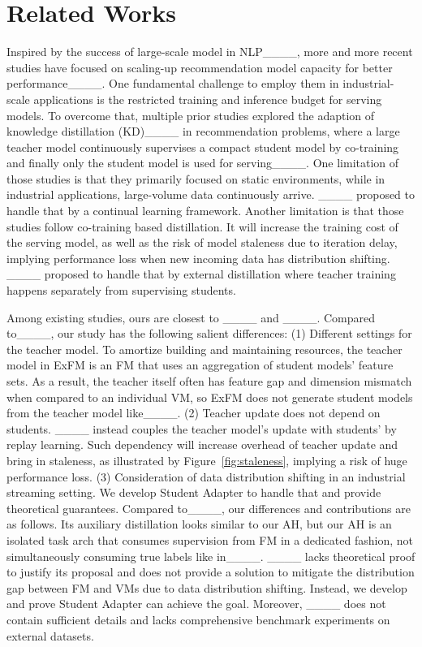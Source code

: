 \section{Related Works}
Inspired by the success of large-scale model in NLP____, more and more recent studies have focused on scaling-up recommendation model capacity for better performance____. 
One fundamental challenge to employ them in industrial-scale applications is the restricted training and inference budget for serving models. 
To overcome that, multiple prior studies explored the adaption of knowledge distillation (KD)____ in recommendation problems, where a large teacher model continuously supervises a compact student model by co-training and finally only the student model is used for serving____. 
One limitation of those studies is that they primarily focused on static environments, while in industrial applications, large-volume data continuously arrive. ____ proposed to handle that by a continual learning framework. 
Another limitation is that those studies follow co-training based distillation. 
It will increase the training cost of the serving model, as well as the risk of model staleness due to iteration delay, implying performance loss when new incoming data has distribution shifting. ____ proposed to handle that by external distillation where teacher training happens separately from supervising students.

Among existing studies, ours are closest to ____ and ____.
Compared to____, our study has the following salient differences: (1) Different settings for the teacher model. To amortize building and maintaining resources, the teacher model in ExFM is an FM that uses an aggregation of student models' feature sets. As a result, the teacher itself often has feature gap and dimension mismatch when compared to an individual VM, so ExFM does not generate student models from the teacher model like____. (2) Teacher update does not depend on students. ____ instead couples the teacher model’s update with students' by replay learning. Such dependency will increase overhead of teacher update and bring in staleness, as illustrated by Figure~\ref{fig:staleness}, implying a risk of huge performance loss. (3) Consideration of data distribution shifting in an industrial streaming setting. We develop Student Adapter to handle that and provide theoretical guarantees. 
Compared to____, our differences and contributions are as follows. 
Its auxiliary distillation looks similar to our AH, but our AH is an isolated task arch that consumes supervision from FM in a dedicated fashion, not simultaneously consuming true labels like in____. 
____ lacks theoretical proof to justify its proposal and does not provide a solution to mitigate the distribution gap between FM and VMs due to data distribution shifting. 
Instead, we develop and prove Student Adapter can achieve the goal. 
Moreover, ____ does not contain sufficient details and lacks comprehensive benchmark experiments on external datasets.